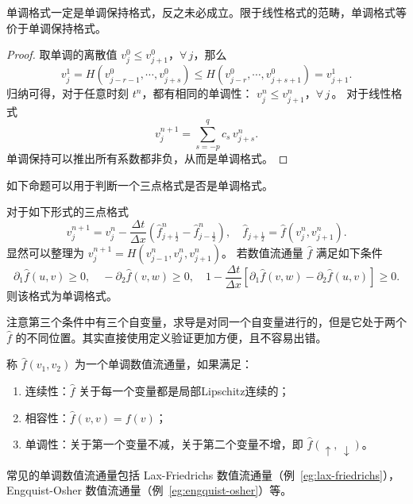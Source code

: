 \begin{theorem}
    单调格式一定是单调保持格式，反之未必成立。限于线性格式的范畴，单调格式等价于单调保持格式。
\end{theorem}

\begin{proof}
    取单调的离散值 $v_j^0 \le v_{j+1}^0$，$\forall\, j$，那么
    \[
        v_{j}^1 = H(v_{j-r-1}^0,\cdots,v_{j+s}^0)
        \le H(v_{j-r}^0,\cdots,v_{j+s+1}^0) = v_{j+1}^1.
    \]
    归纳可得，对于任意时刻 $t^n$，都有相同的单调性： $v_j^n \le v_{j+1}^n$，$\forall\, j$\,。
    对于线性格式
    \[
        v_j^{n+1} = \sum_{s=-p}^q c_s\, v_{j+s}^n.
    \]
    单调保持可以推出所有系数都非负，从而是单调格式。
\end{proof}

如下命题可以用于判断一个三点格式是否是单调格式。
\begin{proposition}
    对于如下形式的三点格式
    \[
        v_{j}^{n+1} = v_j^n - \frac{\Delta t}{\Delta x}\left(
        \hat{f}_{j+\frac12}^n - \hat{f}_{j-\frac12}^n
        \right),\quad \hat{f}_{j+\frac12}=\hat{f}(v_j^n,v_{j+1}^n).
    \]
    显然可以整理为 $v_{j}^{n+1} = H(v_{j-1}^n,v_j^n,v_{j+1}^n)$。
    若数值流通量 $\hat{f}$ 满足如下条件
    \[
        \partial_1\hat{f}(u,v) \ge 0,\quad
        - \partial_2 \hat{f}(v,w) \ge 0,\quad
        1 - \frac{\Delta t}{\Delta x}\left[\partial_1 \hat{f}(v,w) - \partial_2 \hat{f}(u,v)\right] \ge 0.
    \]
    则该格式为单调格式。
\end{proposition}

\begin{remark}
    注意第三个条件中有三个自变量，求导是对同一个自变量进行的，但是它处于两个 $\hat{f}$ 的不同位置。其实直接使用定义验证更加方便，且不容易出错。
\end{remark}

\begin{definition}[单调数值流通量]
    称 $\hat{f}(v_1,v_2)$ 为一个单调数值流通量，如果满足：
    \begin{enumerate}
        \item 连续性：$\hat{f}$ 关于每一个变量都是局部Lipschitz连续的；
        \item 相容性：$\hat{f}(v,v) = f(v)$；
        \item 单调性：关于第一个变量不减，关于第二个变量不增，即 $\hat{f}(\uparrow,\, \downarrow)$。
    \end{enumerate}
\end{definition}

\begin{remark}
    常见的单调数值流通量包括 Lax-Friedrichs 数值流通量（例~\ref{eg:lax-friedrichs}），Engquist-Osher 数值流通量（例~\ref{eg:engquist-osher}）等。
\end{remark}


